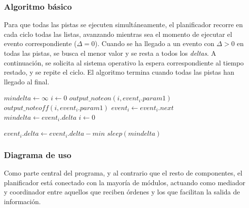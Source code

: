 \subsubsection{Algoritmo básico}

Para que todas las pistas se ejecuten simultáneamente, el planificador recorre en cada ciclo todas las listas, avanzando mientras sea el momento de ejecutar el evento correspondiente ($\Delta=0$). Cuando se ha llegado a un evento con $\Delta > 0$ en todas las pistas, se busca el menor valor y se resta a todos los \textit{deltas}. A continuación, se solicita al sistema operativo la espera correspondiente al tiempo restado, y se repite el ciclo. El algoritmo termina cuando todas las pistas han llegado al final.

\begin{algorithmic}
	\LOOP
		\STATE $mindelta \gets \infty$
		\STATE $i\gets 0$
					\STATE $output\_noteon(i, event_i.param1)$
				\ELSE 
						\STATE $output\_noteoff (i, event_i.param1)$
					\ENDIF
				\ENDIF
				\STATE $event_i \gets event_i.next$
			\ENDWHILE
				\STATE $mindelta \gets event_i.delta$
			\ENDIF
		\ENDWHILE
		\STATE $i \gets 0$
		
			\STATE $event_i.delta \gets event_i.delta - min$
		\ENDWHILE
		\STATE $sleep (mindelta)$
	\ENDLOOP
\end{algorithmic}

\subsubsection{Diagrama de uso}

Como parte central del programa, y al contrario que el resto de componentes, el planificador está conectado con la mayoría de módulos, actuando como mediador y coordinador entre aquellos que reciben órdenes y los que facilitan la salida de información.

\smallskip

